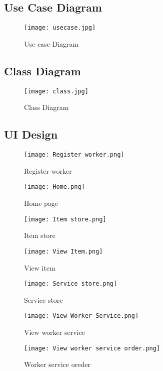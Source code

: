 \documentclass[conference]{IEEEtran}
\begin{document}
\subsection{Use Case Diagram}
\begin{figure}[H]
    \centering
    \texttt{[image: usecase.jpg]}
    \caption{Use case Diagram}
    \label{fig:usecase}
\end{figure}






\newpage
\subsection{Class Diagram}
\begin{figure}[H]
    \centering
    \texttt{[image: class.jpg]}
    \caption{Class Diagram}
    \label{fig:class}
\end{figure}




\vspace{2cm}
\subsection{UI Design}
\begin{figure}[H]
    \centering
    \texttt{[image: Register worker.png]}
    \caption{Register worker}
    \label{fig:registerWorker}
\end{figure}
\begin{figure}[H]
    \centering
    \texttt{[image: Home.png]}
    \caption{Home page}
    \label{fig:home}
\end{figure}
\begin{figure}[H]
    \centering
    \texttt{[image: Item store.png]}
    \caption{Item store}
    \label{fig:itemStore}
\end{figure}
\begin{figure}[H]
    \centering
    \texttt{[image: View Item.png]}
    \caption{View item}
    \label{fig:viewItem}
\end{figure}
\begin{figure}[H]
    \centering
    \texttt{[image: Service store.png]}
    \caption{Service store}
    \label{fig:serviceStore}
\end{figure}
\begin{figure}[H]
    \centering
\texttt{[image: View Worker Service.png]}
    \caption{View worker service}
    \label{fig:viewWorkerService}
\end{figure}
\begin{figure}[H]
    \centering
    \texttt{[image: View worker service order.png]}
    \caption{Worker service oreder}
    \label{fig:viewWorkerServiceOrder}
\end{figure}
\end{document}
